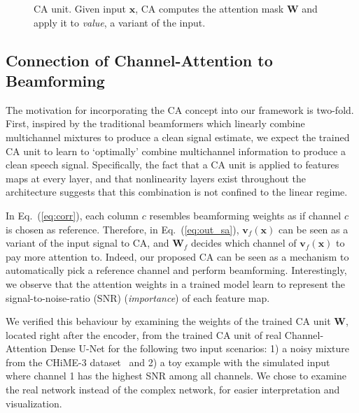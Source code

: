 \documentclass{article}
\newcommand{\smlv}{\mathbf{v}}
\newcommand{\x}{\mathbf{x}}
\newcommand{\ww}{\mathbf{W}}
\begin{document}
\begin{figure}[htb]
\begin{minipage}[b]{1.0\linewidth}
	\end{minipage}
	\vspace*{-6mm}
	\caption{CA unit. Given input $\x$, CA computes the attention mask $\ww$ and apply it to {\it value}, a variant of the input.}
	\label{fig:sa}
	\vspace*{-5mm}
\end{figure}


\subsection{Connection of Channel-Attention to Beamforming}

The motivation for incorporating the CA concept into our framework is two-fold. First, inspired by the traditional beamformers which linearly combine multichannel mixtures to produce a clean signal estimate, we expect the trained CA unit to learn to `optimally' combine multichannel information to produce a clean speech signal. Specifically, the fact that a CA unit is applied to features maps at every layer, and that nonlinearity layers exist throughout the architecture suggests that this combination is not confined to the linear regime.



In Eq.~(\ref{eq:corr}), each column $c$ resembles beamforming weights as if channel $c$ is chosen as reference. Therefore, in Eq.~(\ref{eq:out_sa}), $\smlv_f(\x)$ can be seen as a variant of the input signal to CA, and $\ww_f$ decides which channel of $\smlv_f(\x)$ to pay more attention to. Indeed, our proposed CA can be seen as a mechanism to automatically pick a reference channel and perform beamforming. Interestingly, we observe that the attention weights in a trained model learn to represent the signal-to-noise-ratio (SNR) ({\it importance}) of each feature map.



We verified this behaviour by examining the weights of the trained CA unit $\ww$, located right after the encoder, from the trained CA unit of real Channel-Attention Dense U-Net for the following two input scenarios: 1) a noisy mixture from the CHiME-3 dataset~\cite{chime} and 2) a toy example with the simulated input where channel 1 has the highest SNR among all channels. We chose to examine the real network instead of the complex network, for easier interpretation and visualization.
\end{document}
